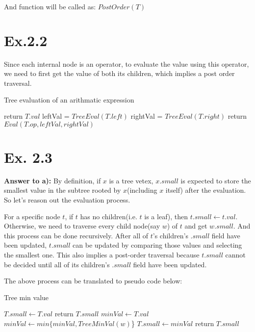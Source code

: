 \documentclass[a4paper,11pt]{article}
\theoremstyle{mytheor}
\begin{document}
And function will be called as: $PostOrder(T)$

\vspace{1.2in}

\section*{Ex.2.2}
Since each internal node is an operator, to evaluate the value using this operator, we need to first get the value of both its children, which implies a post order traversal.

\begin{algorithm}[H]
\caption{Tree evaluation of an arithmatic expression}\label{TREEEVALUATION_2_2}
\begin{algorithmic}[1]
    \State return $T.val$
  \EndIf
  \State leftVal = $TreeEval(T.left)$
  \State rightVal = $TreeEval(T.right)$
  \State return $Eval(T.op, leftVal, rightVal)$
\EndFunction
\end{algorithmic}
\end{algorithm}


\vspace{1.2in}

\section*{Ex. 2.3}
\noindent\textbf{Answer to a):} By definition, if $x$ is a tree vetex, $x.small$ is expected to store the smallest value in the subtree rooted by $x$(including $x$ itself) after the evaluation. So let's reason out the evaluation process.

For a specific node $t$, if $t$ has no children(i.e. $t$ is a leaf), then $t.small \gets t.val$. Otherwise, we need to traverse every child node(say $w$) of $t$ and get $w.small$. And this process can be done recursively. After all of $t$'s children's $.small$ field have been updated, $t.small$ can be updated by comparing those values and selecting the smallest one. This also implies a post-order traversal because $t.small$ cannot be decided until all of its children's $.small$ field have been updated.

The above process can be translated to pseudo code below:

\begin{algorithm}[H]
\caption{Tree min value}\label{sec:TREEEVALUATION_2_3_1}
\begin{algorithmic}[1]
   \label{sec:TREEEVALUATION_2_3_1_L1}
    \State $T.small \gets T.val$
    \State return $T.small$ \label{sec:TREEEVALUATION_2_3_1_L2}
  \Else
    \State $minVal \gets T.val$
      \State $minVal \gets min\{minVal, TreeMinVal(w)$\} 
    \EndFor
    \State $T.small \gets minVal$
    \State return $T.small$
  \EndIf
\EndFunction
\end{algorithmic}
\end{algorithm}
\end{document}
